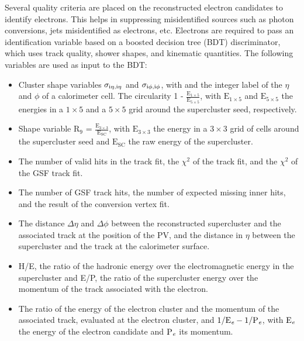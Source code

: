 Several quality criteria are placed on the reconstructed electron candidates to identify electrons. This helps in suppressing misidentified sources such as photon conversions, jets misidentified as electrons, etc. Electrons are required to pass an identification variable based on a boosted decision tree (BDT) discriminator, which uses track quality, shower shapes, and kinematic quantities. The following variables are used as input to the BDT:
\begin{itemize}
  \item Cluster shape variables $\sigma_{\text{i}\eta, \text{i}\eta}$ and $\sigma_{\text{i}\phi, \text{i}\phi}$, with \ieta and \iphi the integer label of the $\eta$ and $\phi$ of a calorimeter cell. The circularity 1 - $\frac{\text{E}_{1 \times 5}}{\text{E}_{5 \times 5}}$, with $\text{E}_{1 \times 5}$ and $\text{E}_{5 \times 5}$ the energies in a $1 \times 5$ and a $5 \times 5$ grid around the supercluster seed, respectively.
  \item Shape variable $\text{R}_{9}$ = $\frac{\text{E}_{3 \times 3}}{\text{E}_{\text{SC}}}$, with $\text{E}_{3 \times 3}$ the energy in a $3 \times 3$ grid of cells around the supercluster seed and $\text{E}_{\text{SC}}$ the raw energy of the supercluster.
  \item The number of valid hits in the track fit, the $\chi^{2}$ of the track fit, and the $\chi^{2}$ of the GSF track fit.
  \item The number of GSF track hits, the number of expected missing inner hits, and the result of the conversion vertex fit.
  \item The distance $\Delta \eta$ and $\Delta \phi$ between the reconstructed supercluster and the associated track at the position of the PV, and the distance in $\eta$ between the supercluster and the track at the calorimeter surface.
  \item H/E, the ratio of the hadronic energy over the electromagnetic energy in the supercluster and E/P, the ratio of the supercluster energy over the momentum of the track associated with the electron.
  \item The ratio of the energy of the electron cluster and the momentum of the associated track, evaluated at the electron cluster, and $1/\text{E}_{\textit{e}} - 1/\text{P}_{\textit{e}}$, with $\text{E}_{\textit{e}}$ the energy of the electron candidate and $\text{P}_{\textit{e}}$ its momentum.
\end{itemize}

